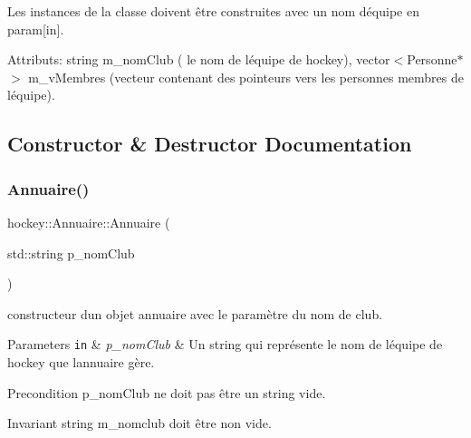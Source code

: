 Les instances de la classe doivent être construites avec un nom d\textquotesingle{}équipe en param\mbox{[}in\mbox{]}. 

Attributs\+: string m\+\_\+nom\+Club ( le nom de l\textquotesingle{}équipe de hockey), vector$<$\+Personne$\ast$$>$ m\+\_\+v\+Membres (vecteur contenant des pointeurs vers les personnes membres de l\textquotesingle{}équipe). 

\subsection{Constructor \& Destructor Documentation}
\mbox{\label{classhockey_1_1Annuaire_ac756b17e484628d1e5386e9252f26d65}} 
\subsubsection{\texorpdfstring{Annuaire()}{Annuaire()}\hspace{0.1cm}{\footnotesize\ttfamily [1/2]}}
{\footnotesize\ttfamily hockey\+::\+Annuaire\+::\+Annuaire (\begin{DoxyParamCaption}\item[{std\+::string}]{p\+\_\+nom\+Club }\end{DoxyParamCaption})}



constructeur d\textquotesingle{}un objet annuaire avec le paramètre du nom de club. 


\begin{DoxyParams}[1]{Parameters}
\mbox{\tt in}  & {\em p\+\_\+nom\+Club} & Un string qui représente le nom de l\textquotesingle{}équipe de hockey que l\textquotesingle{}annuaire gère. \\
\hline
\end{DoxyParams}
\begin{DoxyPrecond}{Precondition}
p\+\_\+nom\+Club ne doit pas être un string vide. 
\end{DoxyPrecond}
\begin{DoxyInvariant}{Invariant}
string m\+\_\+nomclub doit être non vide. 
\end{DoxyInvariant}
\mbox{\label{classhockey_1_1Annuaire_a9ced0f8c3c376e8e114ef04fd6b21e75}} 
